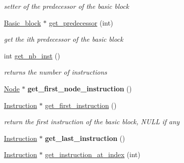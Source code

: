 \begin{DoxyCompactItemize}
\begin{DoxyCompactList}\small\item\em setter of the predecessor of the basic block \end{DoxyCompactList}\item 
\hypertarget{class_basic__block_a5381da0d3cfdae07df433ffac3e8ebae}{\hyperlink{class_basic__block}{Basic\-\_\-block} $\ast$ \hyperlink{class_basic__block_a5381da0d3cfdae07df433ffac3e8ebae}{get\-\_\-predecessor} (int)}\label{class_basic__block_a5381da0d3cfdae07df433ffac3e8ebae}

\begin{DoxyCompactList}\small\item\em get the ith predecessor of the basic block \end{DoxyCompactList}\item 
\hypertarget{class_basic__block_ad3d770c77ba92d455fa3430df5f16eff}{int \hyperlink{class_basic__block_ad3d770c77ba92d455fa3430df5f16eff}{get\-\_\-nb\-\_\-inst} ()}\label{class_basic__block_ad3d770c77ba92d455fa3430df5f16eff}

\begin{DoxyCompactList}\small\item\em returns the number of instructions \end{DoxyCompactList}\item 
\hypertarget{class_basic__block_afafa2ede7f9146fba4020c7764b8ecca}{\hyperlink{class_node}{Node} $\ast$ {\bfseries get\-\_\-first\-\_\-node\-\_\-instruction} ()}\label{class_basic__block_afafa2ede7f9146fba4020c7764b8ecca}

\item 
\hypertarget{class_basic__block_ae6bb481bd9c6352a9f3d7bc5bb2680ac}{\hyperlink{class_instruction}{Instruction} $\ast$ \hyperlink{class_basic__block_ae6bb481bd9c6352a9f3d7bc5bb2680ac}{get\-\_\-first\-\_\-instruction} ()}\label{class_basic__block_ae6bb481bd9c6352a9f3d7bc5bb2680ac}

\begin{DoxyCompactList}\small\item\em return the first instruction of the basic block, N\-U\-L\-L if any \end{DoxyCompactList}\item 
\hypertarget{class_basic__block_a7083c8485a2378cdfae477a8466eb348}{\hyperlink{class_instruction}{Instruction} $\ast$ {\bfseries get\-\_\-last\-\_\-instruction} ()}\label{class_basic__block_a7083c8485a2378cdfae477a8466eb348}

\item 
\hypertarget{class_basic__block_a84aa42e38e2494c2f8ab0a159dba3ca8}{\hyperlink{class_instruction}{Instruction} $\ast$ \hyperlink{class_basic__block_a84aa42e38e2494c2f8ab0a159dba3ca8}{get\-\_\-instruction\-\_\-at\-\_\-index} (int)}\label{class_basic__block_a84aa42e38e2494c2f8ab0a159dba3ca8}


\end{DoxyCompactItemize}
